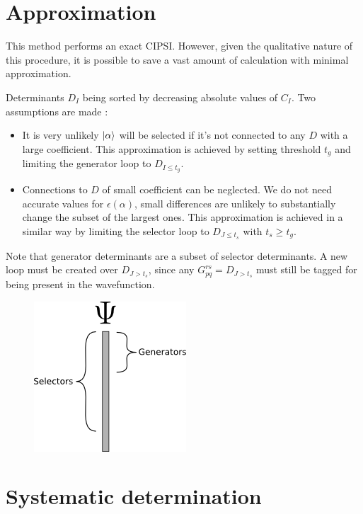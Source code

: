 \documentclass[./thesis.tex]{subfiles}
\begin{document}
\section{Approximation}

This method performs an exact CIPSI. However, given the qualitative nature of this procedure, it is possible to save a vast amount of calculation with minimal approximation.

Determinants $D_I$ being sorted by decreasing absolute values of $C_I$. Two assumptions are made :
\begin{itemize}
\item
It is very unlikely $\ket \alpha$ will be selected if it's not connected to any $D$ with a large coefficient. This approximation is achieved by setting threshold $t_g$ and limiting the generator loop to $D_{I \leq t_g}$.
\item
Connections to $D$ of small coefficient can be neglected. We do not need accurate values for $\epsilon(\alpha)$, small differences are unlikely to substantially change the subset of the largest ones. This approximation is achieved in a similar way by limiting the selector loop to $D_{J \leq t_s}$ with $t_s \geq t_g$.
\end{itemize}

Note that generator determinants are a subset of selector determinants.
A new loop must be created over $D_{J > t_s}$, since any $G_{pq}^{rs}=D_{J > t_s}$ must still be tagged for being present in the wavefunction.

\begin{figure}[h!]
	\begin{center}
		\includegraphics[width=0.4\columnwidth]{figures/cipsi/selexemple2}
		\caption{{\label{selexemple2}%
		}}
	\end{center}
\end{figure}






\section{Systematic determination}
\end{document}
